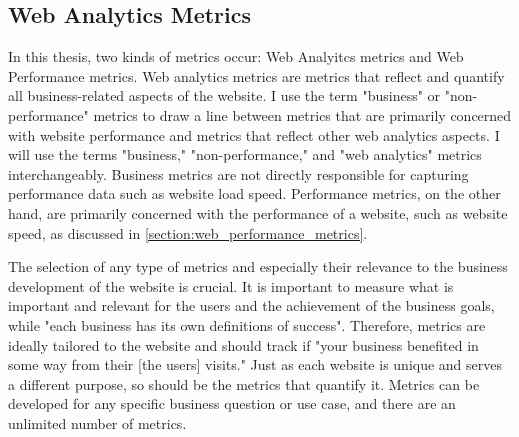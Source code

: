


\subsection{Web Analytics Metrics} %
\label{subsection:web_analytics_metrics}






In this thesis, two kinds of metrics occur: Web Analyitcs metrics and Web Performance metrics.
Web analytics metrics are metrics that reflect and quantify all business-related aspects of the website.
I use the term "business" or "non-performance" metrics to draw a line between metrics that are primarily concerned with website performance and metrics that reflect other web analytics aspects.
I will use the terms "business," "non-performance," and "web analytics" metrics interchangeably.
Business metrics are not directly responsible for capturing performance data such as website load speed.
Performance metrics, on the other hand, are primarily concerned with the performance of a website, such as website speed, as discussed in \ref{section:web_performance_metrics}.


The selection of any type of metrics and especially their relevance to the business development of the website is crucial.
It is important to measure what is important and relevant for the users and the achievement of the business goals, while "each business has its own definitions of success". %
Therefore, metrics are ideally tailored to the website and should track if "your business benefited in some way from their [the users] visits." %
Just as each website is unique and serves a different purpose, so should be the metrics that quantify it.
Metrics can be developed for any specific business question or use case, and there are an unlimited number of metrics.

